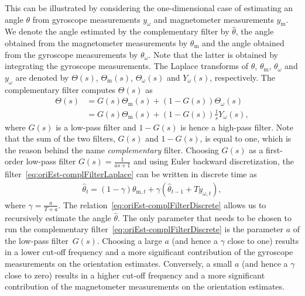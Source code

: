 This can be illustrated by considering the one-dimensional case of estimating an angle $\theta$ from gyroscope measurements $y_\omega$ and magnetometer measurements $y_\text{m}$. We denote the angle estimated by the complementary filter by $\hat{\theta}$, the angle obtained from the magnetometer measurements by $\theta_\text{m}$ and the angle obtained from the gyroscope measurements by $\theta_\omega$. Note that the latter is obtained by integrating the gyroscope measurements. The Laplace transforms of $\theta$, $\theta_\text{m}$, $\theta_\omega$ and $y_{\omega}$ are denoted by $\Theta(s)$, $\Theta_\text{m}(s)$, $\Theta_\omega(s)$ and $Y_{\omega}(s)$, respectively. The complementary filter computes $\Theta(s)$ as
\begin{align}
\label{eq:oriEst-complFilterLaplace}
\Theta(s) &= G(s) \Theta_\text{m}(s) + \left( 1 - G(s) \right) \Theta_{\omega}(s) \nonumber \\
&= G(s) \Theta_\text{m}(s) + \left( 1 - G(s) \right) \tfrac{1}{s} Y_\omega(s),
\end{align}
where $G(s)$ is a low-pass filter and $1 - G(s)$ is hence a high-pass filter. Note that the sum of the two filters, $G(s)$ and $1 - G(s)$, is equal to one, which is the reason behind the name \emph{complementary} filter. Choosing $G(s)$ as a first-order low-pass filter $G(s) = \tfrac{1}{a s + 1}$ and using Euler backward discretization, the filter~\eqref{eq:oriEst-complFilterLaplace} can be written in discrete time as
\begin{align}
\label{eq:oriEst-complFilterDiscrete}
\hat{\theta}_{t} = ( 1 - \gamma ) \theta_{\text{m},t} + \gamma \left( \hat{\theta}_{t-1} + T y_{\omega,t} \right),
\end{align}
where $\gamma = \tfrac{a}{T + a}$. The relation~\eqref{eq:oriEst-complFilterDiscrete} allows us to recursively estimate the angle $\hat{\theta}$. The only parameter that needs to be chosen to run the complementary filter~\eqref{eq:oriEst-complFilterDiscrete} is the parameter $a$ of the low-pass filter~$G(s)$. Choosing a large $a$ (and hence a $\gamma$ close to one) results in a lower cut-off frequency and a more significant contribution of the gyroscope measurements on the orientation estimates. Conversely, a small $a$ (and hence a $\gamma$ close to zero) results in a higher cut-off frequency and a more significant contribution of the magnetometer measurements on the orientation estimates. 

